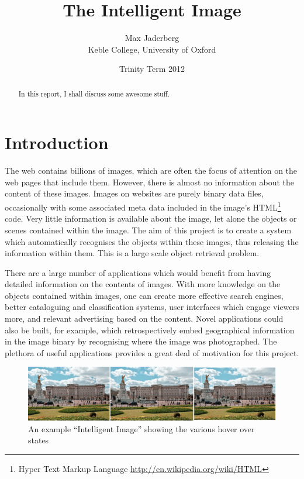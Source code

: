 \documentclass[11pt, onecolumn, a4paper, final]{report} %
\title{The Intelligent Image}
\author{Max Jaderberg\\
	Keble College, University of Oxford}
\date{Trinity Term 2012}
\begin{document}
\maketitle

\begin{abstract}
In this report, I shall discuss some awesome stuff.
\end{abstract}

\chapter{Introduction}
The web contains billions of images, which are often the focus of attention on the web pages that include them. However, there is almost no information about the content of these images. Images on websites are purely binary data files, occasionally with some associated meta data included in the image's HTML\footnote{Hyper Text Markup Language \url{http://en.wikipedia.org/wiki/HTML}} code. Very little information is available about the image, let alone the objects or scenes contained within the image. The aim of this project is to create a system which automatically recognises the objects within these images, thus releasing the information within them. This is a large scale object retrieval problem.

There are a large number of applications which would benefit from having detailed information on the contents of images. With more knowledge on the objects contained within images, one can create more effective search engines, better cataloguing and classification systems, user interfaces which engage viewers more, and relevant advertising based on the content. Novel applications could also be built, for example, which retrospectively embed geographical information in the image binary by recognising where the image was photographed. The plethora of useful applications provides a great deal of motivation for this project.

\begin{figure}[ht]
\centering 
\includegraphics{images/intimage.png}
\caption{An example ``Intelligent Image'' showing the various hover over states}
\label{fig:intimage}
\end{figure}
\end{document}
